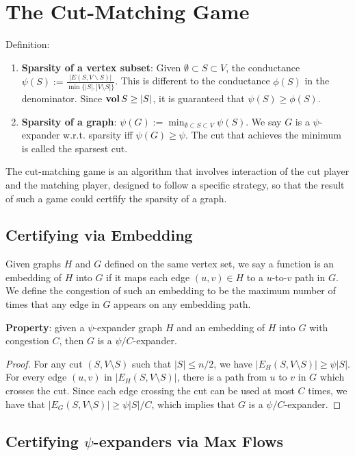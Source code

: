 \section{The Cut-Matching Game}
Definition:
\begin{enumerate}
    \item \textbf{Sparsity of a vertex subset}: Given $\emptyset \subset S \subset V$, the conductance $\psi(S) := \frac{|E(S, V \backslash S)|}{\min \{|S|, |V\setminus S|\}}$. This is different to the conductance $\phi(S)$ in the denominator. Since $\operatorname{\textbf{vol}}{S} \ge |S|$, it is guaranteed that $\psi(S) \ge \phi(S)$.
    \item \textbf{Sparsity of a graph}: $\psi(G):= \min_{\emptyset \subset S \subset V} \psi(S)$. We say $G$ is a $\psi$-expander w.r.t. sparsity iff $\psi(G) \ge \psi$. The cut that achieves the minimum is called the sparsest cut.
\end{enumerate}

The cut-matching game is an algorithm that involves interaction of the cut player and the matching player, designed to follow a specific strategy, so that the result of such a game could certfify the sparsity of a graph.

\subsection{Certifying via Embedding}

Given graphs $H$ and $G$ defined on the same vertex set, we say a function is an embedding of $H$ into $G$ if it maps each edge $(u,v) \in H$ to a $u$-to-$v$ path in $G$. We define the congestion of such an embedding to be the maximum number of times that any edge in $G$ appears on any embedding path.

\textbf{Property}: given a $\psi$-expander graph $H$ and an embedding of $H$ into $G$ with congestion $C$, then $G$ is a $\psi/C$-expander.
\begin{proof}
    For any cut $(S, V\setminus S)$ such that $|S|\le n/2$, we have $|E_H(S, V\setminus S)| \ge \psi |S|$. For every edge $(u,v)$ in $|E_H(S, V\setminus S)|$, there is a path from $u$ to $v$ in $G$ which crosses the cut. Since each edge crossing the cut can be used at most $C$ times, we have that $|E_G(S, V\setminus S)| \ge \psi |S|/C$, which implies that $G$ is a $\psi/C$-expander.
\end{proof}

\subsection{Certifying $\psi$-expanders via Max Flows}

